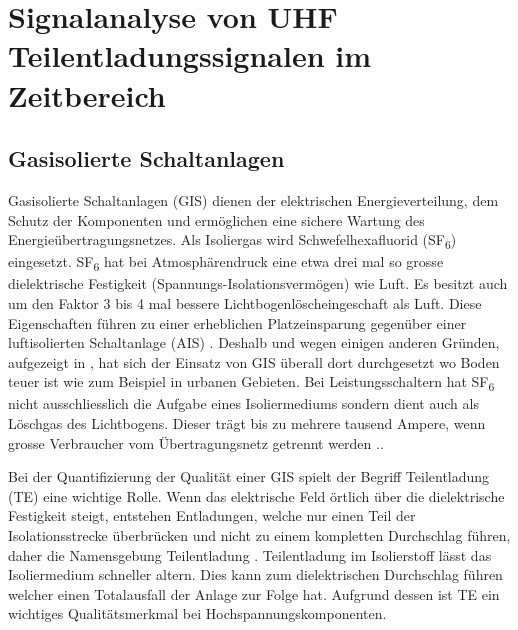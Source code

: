 %
%
%
\chapter{Signalanalyse von UHF Teilentladungssignalen im Zeitbereich \label{chapter:gis}}
\begin{refsection}

\section{Gasisolierte Schaltanlagen}

Gasisolierte Schaltanlagen (GIS) dienen der elektrischen Energieverteilung, dem Schutz der Komponenten und ermöglichen eine sichere Wartung des Energieübertragungsnetzes.
Als Isoliergas wird Schwefelhexafluorid (SF\textsubscript{6}) eingesetzt. SF\textsubscript{6} hat bei Atmosphärendruck eine etwa drei mal so grosse dielektrische Festigkeit (Spannungs-Isolationsvermögen) wie Luft. 
Es besitzt auch um den Faktor 3 bis 4 mal bessere Lichtbogenlöscheingeschaft als Luft. 
Diese Eigenschaften führen zu einer erheblichen Platzeinsparung gegenüber einer luftisolierten Schaltanlage (AIS) \cite{buch:ABB}.
Deshalb und wegen einigen anderen Gründen, aufgezeigt in \cite{buch:GIS/AIS}, hat sich der Einsatz von GIS überall dort durchgesetzt wo Boden teuer ist wie zum Beispiel in urbanen Gebieten. 
Bei Leistungsschaltern hat SF\textsubscript{6} nicht ausschliesslich die Aufgabe eines Isoliermediums sondern dient auch als Löschgas des Lichtbogens.
Dieser trägt bis zu mehrere tausend Ampere, wenn grosse Verbraucher vom Übertragungsnetz getrennt werden \cite{buch:ABB}..  

Bei der Quantifizierung der Qualität einer GIS spielt der Begriff Teilentladung (TE) eine wichtige Rolle. 
Wenn das elektrische Feld örtlich über die dielektrische Festigkeit steigt, entstehen Entladungen, welche nur einen Teil der Isolationsstrecke überbrücken und nicht zu einem kompletten Durchschlag führen, daher die Namensgebung Teilentladung \cite{buch:Kuchler}.
Teilentladung im Isolierstoff lässt das Isoliermedium  schneller altern. Dies kann zum dielektrischen Durchschlag führen welcher einen Totalausfall der Anlage zur Folge hat.
Aufgrund dessen ist TE ein wichtiges Qualitätsmerkmal bei Hochspannungskomponenten. 


\end{refsection}
